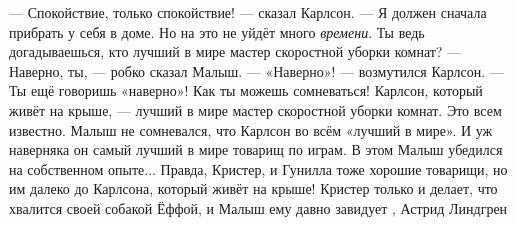 — Спокойствие, только спокойствие! — сказал Карлсон. — Я должен сначала
прибрать у себя в доме. Но на это не уйдёт много \emph{времени}. Ты ведь
догадываешься, кто лучший в мире мастер скоростной уборки комнат?  — Наверно,
ты, — робко сказал Малыш.  — «Наверно»! — возмутился Карлсон. — Ты ещё говоришь
«наверно»! Как ты можешь сомневаться! Карлсон, который живёт на крыше, — лучший
в мире мастер скоростной уборки комнат. Это всем известно.  Малыш не
сомневался, что Карлсон во всём «лучший в мире». И уж наверняка он самый лучший
в мире товарищ по играм. В этом Малыш убедился на собственном опыте... Правда,
Кристер, и Гунилла тоже хорошие товарищи, но им далеко до Карлсона, который
живёт на крыше! Кристер только и делает, что хвалится своей собакой Ёффой, и
Малыш ему давно завидует
, Астрид Линдгрен
